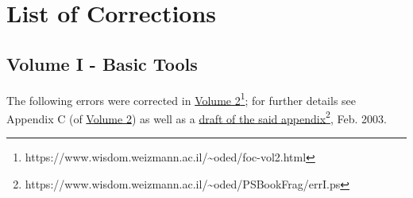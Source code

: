 \documentclass[10pt,a4paper]{article}
\begin{document}
\section{List of Corrections}

\subsection{Volume I - Basic Tools}
The following errors were corrected in \href{https://www.wisdom.weizmann.ac.il/~oded/foc-vol2.html}{Volume 2}\footnote{\label{vol2}https://www.wisdom.weizmann.ac.il/\textasciitilde oded/foc-vol2.html}; for further details see Appendix C (of \href{https://www.wisdom.weizmann.ac.il/~oded/foc-vol2.html}{Volume 2}) as well as a \href{https://www.wisdom.weizmann.ac.il/~oded/PSBookFrag/errI.ps}{draft of the said appendix}\footnote{https://www.wisdom.weizmann.ac.il/\textasciitilde oded/PSBookFrag/errI.ps}, Feb. 2003.
\end{document}
